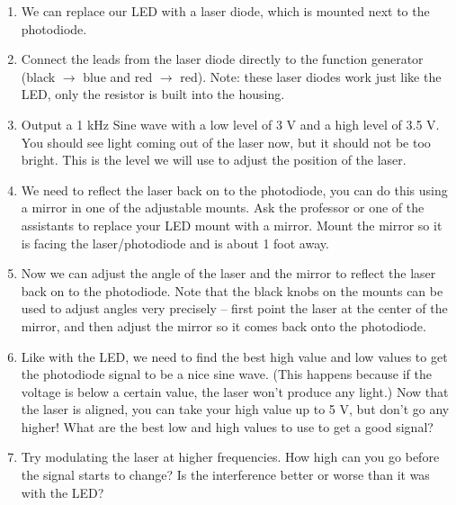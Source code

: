 \documentclass[12pt, letterpaper]{article}
\begin{document}
\begin{enumerate}
	\item We can replace our LED with a laser diode, which is mounted next to the photodiode.
	\item Connect the leads from the laser diode directly to the function generator (black $\rightarrow$ blue and red $\rightarrow$ red).  
	Note: these laser diodes work just like the LED, only the resistor is built into the housing.
	\item Output a 1 kHz Sine wave with a low level of 3 V and a high level of 3.5 V.  You should see light coming out of the laser now, but it should not be too bright.
	This is the level we will use to adjust the position of the laser.  %
	\item We need to reflect the laser back on to the photodiode, you can do this using a mirror in one of the adjustable mounts.  Ask the professor or one of the assistants to replace your LED mount with a mirror.  Mount the mirror so it is facing the laser/photodiode and is about 1 foot away.
	\item
	Now we can adjust the angle of the laser and the mirror to reflect the laser back on to the photodiode.  Note that the black knobs on the mounts can be used to adjust angles very precisely -- first point the laser at the center of the mirror, and then adjust the mirror so it comes  back onto the photodiode.  
	\item Like with the LED, we need to find the best high value and low values to get the photodiode signal to be a nice sine wave.  (This happens because if the voltage is below a certain value, the laser won't produce any light.)
	Now that the laser is aligned, you can take your high value up to 5 V, but don't go any higher!
	What are the best low and high values to use to get a good signal?
	
	\answergrid{5cm}
	\item Try modulating the laser at higher frequencies.  How high can you go before the signal starts to change?  Is the interference better or worse than it was with the LED?
	

\end{enumerate}
\end{document}

